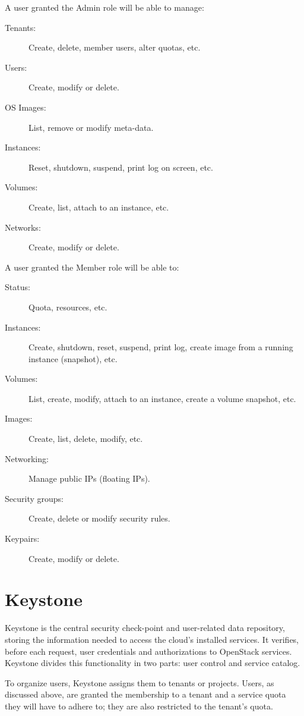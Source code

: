 A user granted the Admin role will be able to manage:

\begin{description}
 \item[Tenants:] Create, delete, member users, alter quotas, etc.
 \item[Users:] Create, modify or delete.
 \item[OS Images:] List, remove or modify meta-data.
 \item[Instances:] Reset, shutdown, suspend, print log on screen, etc.
 \item[Volumes:] Create, list, attach to an instance, etc.
 \item[Networks:] Create, modify or delete.
\end{description}

A user granted the Member role will be able to:

\begin{description}
 \item[Status:] Quota, resources, etc.
 \item[Instances:] Create, shutdown, reset, suspend, print log, create image from a running instance (snapshot), etc.
 \item[Volumes:] List, create, modify, attach to an instance, create a volume snapshot, etc.
 \item[Images:] Create, list, delete, modify, etc.
 \item[Networking:] Manage public IPs (floating IPs).
 \item[Security groups:] Create, delete or modify security rules.
 \item[Keypairs:] Create, modify or delete.
\end{description}

\section{Keystone}\label{sec:keystone}
\noindent Keystone is the central security check-point and user-related data repository, storing the information needed to access the cloud's installed services. It verifies, before each request, user credentials and authorizations to OpenStack services. Keystone divides this functionality in two parts: user control and service catalog.

To organize users, Keystone assigns them to tenants or projects. Users, as discussed above, are granted the membership to a tenant and a service quota they will have to adhere to; they are also restricted to the tenant's quota.

